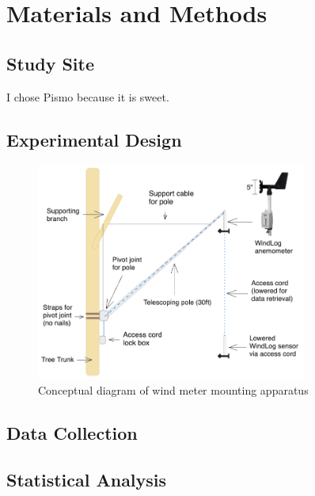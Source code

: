 \section{Materials and Methods}
\subsection{Study Site}
I chose Pismo because it is sweet.

\subsection{Experimental Design}

\begin{figure}[htbp]
    \centering
    \includegraphics[width=3.5in]{figures/pismoPoleDiagram.png}
    \caption{Conceptual diagram of wind meter mounting apparatus}
\end{figure}




\subsection{Data Collection}

\subsection{Statistical Analysis}
